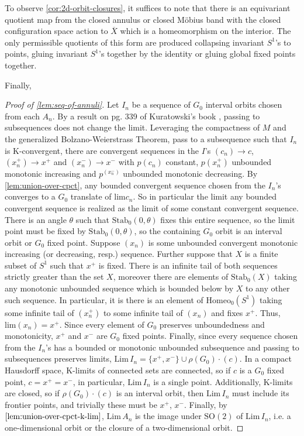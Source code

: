 \documentclass[10pt, oneside]{article}
\newcommand{\SO}[1][2]{\text{SO}(#1)}
\newcommand{\homeo}[1][S^1]{\text{Homeo}_0(#1)}
\newcommand{\cl}[1]{\overline{#1}}
\newcommand{\pstab}[1]{\text{Stab}_0(#1)}
\newcommand{\klim}[1]{\text{Lim}\,#1}
\theoremstyle{definition}
\theoremstyle{definition}
\begin{document}
To observe \cref{cor:2d-orbit-closures}, it suffices to note that there is an equivariant quotient map from the closed annulus or closed M\"{o}bius band with the closed configuration space action to $\cl{X}$ which is a homeomorphism on the interior. The only permissible quotients of this form are produced collapsing invariant $S^1$'s to points, gluing invariant $S^1$'s together by the identity or gluing global fixed points together.

Finally,
\begin{proof}[Proof of \cref{lem:seq-of-annuli}]
    Let $I_n$ be a sequence of $G_0$ interval orbits chosen from each $A_n$. By a result on pg. 339 of Kuratowski's book \cite{kuratowski:TopologyI}, passing to subsequences does not change the limit. Leveraging the compactness of $M$ and the generalized Bolzano-Weierstrass Theorem, pass to a subsequence such that $I_n$ is K-convergent, there are convergent sequences in the $I$'s $(c_n)\to c$, $(x^+_n)\to x^+$ and $(x^-_n)\to x^-$ with $p(c_n)$ constant, $p(x^+_n)$ unbounded monotonic increasing and $p^(x^-_n)$ unbounded monotonic decreasing. By \cref{lem:union-over-cpct}, any bounded convergent sequence chosen from the $I_n$'s converges to a $G_0$ translate of $\text{lim} c_n$. So in particular the limit any bounded convergent sequence is realized as the limit of some constant convergent sequence. There is an angle $\theta$ such that $\pstab{0, \theta}$ fixes this entire sequence, so the limit point must be fixed by  $\pstab{0, \theta}$, so the containing $G_0$ orbit is an interval orbit or $G_0$ fixed point. Suppose $(x_n)$ is some unbounded convergent monotonic increasing (or decreasing, resp.) sequence. Further suppose that $X$ is a finite subset of $S^1$ such that $x^+$ is fixed. There is an infinite tail of both sequences strictly greater than the set $X$, moreover there are elements of $\pstab{X}$ taking any monotonic unbounded sequence which is bounded below by $X$ to any other such sequence. In particular, it is there is an element of $\homeo$ taking some infinite tail of $(x^+_n)$ to some infinite tail of $(x_n)$ and fixes $x^+$. Thus, $\text{lim}(x_n) = x^+$. Since every element of $G_0$ preserves unboundedness and monotonicity, $x^+$ and $x^-$ are $G_0$ fixed points. Finally, since every sequence chosen from the $I_n$'s has a bounded or monotonic unbounded subsequence and passing to subsequences preserves limits, $\klim I_n = \{x^+, x^-\}\cup \rho(G_0)\cdot(c)$. In a compact Hausdorff space, K-limits of connected sets are connected, so if $c$ is a $G_0$ fixed point, $c=x^+=x^-$, in particular, $\klim I_n$ is a single point. Additionally, K-limits are closed, so if $\rho(G_0)\cdot(c)$ is an interval orbit, then $\klim I_n$ must include its frontier points, and trivially these must be $x^+$, $x^-$. Finally, by $\cref{lem:union-over-cpct-k-lim}$, $\klim A_n$ is the image under $\SO$ of $\klim I_n$, i.e. a one-dimensional orbit or the closure of a two-dimensional orbit.
\end{proof}
\end{document}
